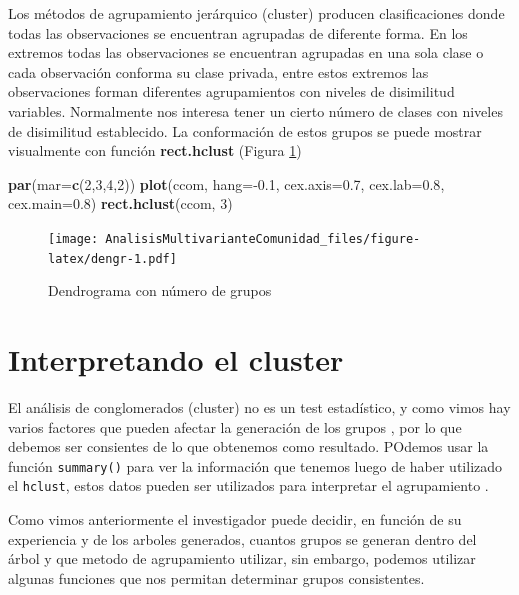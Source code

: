 \documentclass[]{book}
\newenvironment{Shaded}{\begin{snugshade}}{\end{snugshade}}
\newcommand{\KeywordTok}[1]{\textcolor[rgb]{0.13,0.29,0.53}{\textbf{{#1}}}}
\newcommand{\DataTypeTok}[1]{\textcolor[rgb]{0.13,0.29,0.53}{{#1}}}
\newcommand{\DecValTok}[1]{\textcolor[rgb]{0.00,0.00,0.81}{{#1}}}
\newcommand{\FloatTok}[1]{\textcolor[rgb]{0.00,0.00,0.81}{{#1}}}
\newcommand{\NormalTok}[1]{{#1}}
\begin{document}
Los métodos de agrupamiento jerárquico (cluster) producen
clasificaciones donde todas las observaciones se encuentran agrupadas de
diferente forma. En los extremos todas las observaciones se encuentran
agrupadas en una sola clase o cada observación conforma su clase
privada, entre estos extremos las observaciones forman diferentes
agrupamientos con niveles de disimilitud variables. Normalmente nos
interesa tener un cierto número de clases con niveles de disimilitud
establecido. La conformación de estos grupos se puede mostrar
visualmente con función \textbf{rect.hclust} (Figura \ref{fig:dengr})

\begin{Shaded}
\begin{Highlighting}[]
\KeywordTok{par}\NormalTok{(}\DataTypeTok{mar=}\KeywordTok{c}\NormalTok{(}\DecValTok{2}\NormalTok{,}\DecValTok{3}\NormalTok{,}\DecValTok{4}\NormalTok{,}\DecValTok{2}\NormalTok{))}
\KeywordTok{plot}\NormalTok{(ccom, }\DataTypeTok{hang=}\NormalTok{-}\FloatTok{0.1}\NormalTok{, }\DataTypeTok{cex.axis=}\FloatTok{0.7}\NormalTok{, }\DataTypeTok{cex.lab=}\FloatTok{0.8}\NormalTok{, }\DataTypeTok{cex.main=}\FloatTok{0.8}\NormalTok{)}
\KeywordTok{rect.hclust}\NormalTok{(ccom, }\DecValTok{3}\NormalTok{)}
\end{Highlighting}
\end{Shaded}

\begin{figure}[htbp]
\centering
\texttt{[image: AnalisisMultivarianteComunidad\_files/figure-latex/dengr-1.pdf]}
\caption{\label{fig:dengr}Dendrograma con número de grupos}
\end{figure}

\section{Interpretando el cluster}\label{interpretando-el-cluster}

El análisis de conglomerados (cluster) no es un test estadístico, y como
vimos hay varios factores que pueden afectar la generación de los grupos
\citep{Borcard2011}, por lo que debemos ser consientes de lo que
obtenemos como resultado. POdemos usar la función \texttt{summary()}
para ver la información que tenemos luego de haber utilizado el
\texttt{hclust}, estos datos pueden ser utilizados para interpretar el
agrupamiento \citep{Borcard2011}.

Como vimos anteriormente el investigador puede decidir, en función de su
experiencia y de los arboles generados, cuantos grupos se generan dentro
del árbol y que metodo de agrupamiento utilizar, sin embargo, podemos
utilizar algunas funciones que nos permitan determinar grupos
consistentes.
\end{document}
